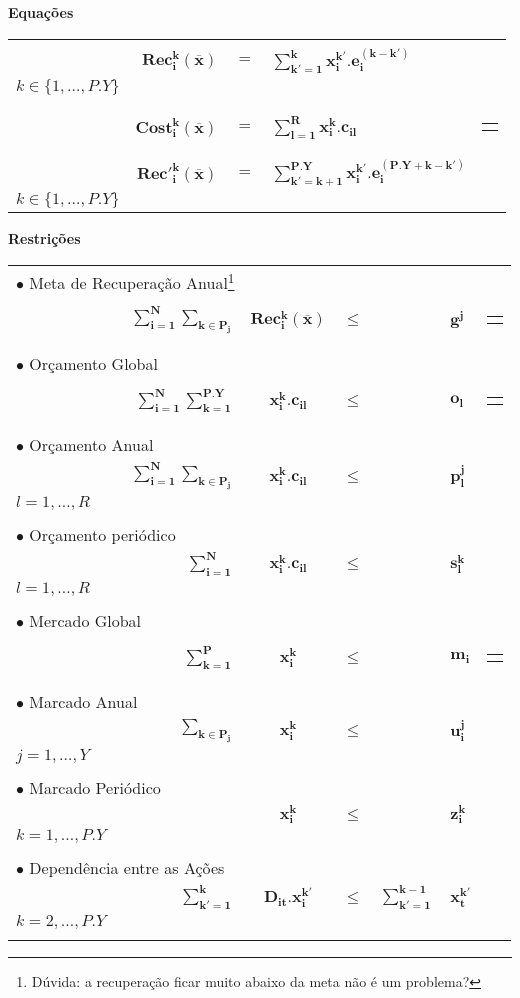 \documentclass{article}
\newcommand{\topico}[1]{
  \vspace{20pt}
  {\Large \bf #1 }
}
\newenvironment{restricoes}
  { \begin{longtable}{lrcclll}}
  {\end{longtable} }
\newcommand{\restricao}[7]{
    \multicolumn{2}{l}{ $\bullet$ #1} & & \\ \nopagebreak
    & ${ \displaystyle \bm{#2} }$
    & ${ \bm{#3} }$
    & ${ \bm{#4} }$
    & ${ \displaystyle \bm{#5} }$
    & ${ \bm{#6} }$
	& \begin{tabular}{l}
	  #7
    \end{tabular}
	\\ \hspace{30pt}
}
\newenvironment{equacoes}
	{ \begin{longtable}{lrcll} }
	{ \end{longtable} }
\newcommand{\equacao}[4]{
    \multicolumn{5}{l}{\text{ \parbox{250pt}{$\bullet$ #1} }} \\   %
    \phantom{aaaaaa} & $ \displaystyle \bm{#2} $                              %
    & $ = $                 
	& $\displaystyle \bm{#3} $                           %
	&
	\begin{tabular}{l}
	  #4                                 %
	\end{tabular}
	\vspace{12pt}
	\\
}
\begin{document}
\topico{Equações}

\begin{equacoes}
    \equacao
	  {Total de energia recuperada para o $k$-ésimo período, considerando as ações $i$ de todos os períodos.}
	  {Rec_{i}^{k}(\overline{x})}
	  {\sum_{k'=1}^{k} x_i^{k'} . e_i^{(k-k')}}
	  { $i \in \{1, \ldots, N\}$ \\ $k \in \{1, \ldots, P.Y\}$ }
	\equacao
	  {Custo total de todas as ações executadas no período $k$.}
	  {Cost_i^k(\overline{x})}
	  {\sum_{l=1}^R x_i^k . c_{il}}
	  { $k \in \{1, \ldots, P.Y\}$}
	\equacao
	  {Recuperação de energia para o $k$-ésimo  período após o plano, causada pelas as ações $i$ de todos os períodos.}
	  {{Rec'}_{i}^k(\overline{x})}
	  {\sum_{k'=k+1}^{P.Y} x_i^{k'} . e_i^{(P.Y+k-k')}}
	  { $i \in \{1, \ldots, N\}$ \\ $k \in \{1, \ldots, P.Y\}$ }
\end{equacoes}

\topico{Restrições}

\begin{restricoes}
    \restricao
	  {Meta de Recuperação Anual\footnote{Dúvida: a recuperação ficar muito abaixo da meta não é um problema?}}
	  { \sum_{i = 1}^N \sum_{k \in P_j}}
	  { Rec_i^k(\overline{x})}
	  { \leq }
	  { }
	  { g^j }
	  { $ j = 1, \ldots, Y $ }
	\\
    \restricao
	  {Orçamento Global}
	  { \sum_{i = 1}^N \sum_{k = 1}^{P.Y} }
	  { x_i^k . c_{il}}
	  { \leq }
	  { }
	  { o_l }
	  { $ l = 1, \ldots, R $ }
	\\
    \restricao
      {Orçamento Anual}
      { \sum_{i = 1}^N \sum_{k \in P_j} }
      { x_i^k . c_{il} }
	  { \leq }
	  { }
	  { p_l^j }
	  { $ j = 1, \ldots, Y $ \\ $ l = 1, \ldots, R$ }
    \\
	\restricao
	  {Orçamento periódico}
      { \sum_{i = 1}^N }
      { x_i^k . c_{il} }
	  { \leq }
	  { }
	  { s_l^{k} }
	  { $ k = 1, \ldots, P.Y $ \\ $ l = 1, \ldots, R $ }
	\\
	\restricao
	  {Mercado Global}
      { \sum_{k = 1}^P }
      { x_i^k }
	  { \leq }
	  { }
	  { m_i }
	  { $ i = 1, \ldots, N $ }
	\\
	\restricao
	  {Marcado Anual}
      { \sum_{k \in P_j} }
      { x_i^k }
	  { \leq }
	  { }
	  { u_i^j }
	  { $ i = 1, \ldots, N $ \\ $ j = 1, \ldots, Y $ }
	\\
	\restricao
	  {Marcado Periódico}
      { }
      { x_i^k }
	  { \leq }
	  { }
	  { z_i^k }
	  { $ i = 1, \ldots, N $ \\ $ k = 1, \ldots, P.Y$ }
	\\
	\restricao
	  {Dependência entre as Ações}
      { \sum_{k' = 1}^k }
      { D_{it} . x_i^{k'} }
	  { \leq }
	  { \sum_{k' = 1 }^{k-1} }
	  { x_t^{k'} }
	  { $i,t=1,\ldots,N$ \\ $k=2,\ldots,P.Y$ }
\end{restricoes}
\end{document}
